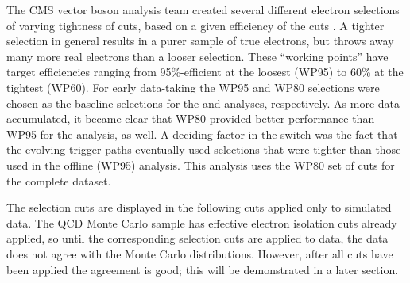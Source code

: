 The CMS vector boson analysis team created several different electron selections of varying tightness of cuts,
based on a given efficiency of the cuts \cite{CMSWZ}.  %
A tighter selection in general results in a purer sample of true electrons, but throws away many more
real electrons than a looser selection.  
These ``working points'' have target efficiencies ranging from 95\%-efficient at the loosest (WP95) to 60\% at the tightest (WP60).  
For early data-taking the WP95 and WP80 selections were chosen as the baseline selections for the \Zee and \Wenu analyses, respectively.
As more data accumulated, it became clear that WP80 provided better performance than WP95 for the \Zee analysis, as well.  
A deciding factor in the switch was the fact that the evolving trigger paths eventually used selections that were
tighter than those used in the offline (WP95) analysis.  
This analysis uses the WP80 set of cuts for the complete dataset.  

The selection cuts are displayed in the following cuts applied only to simulated data.  
The QCD Monte Carlo sample has effective electron isolation cuts already applied, 
so until the corresponding selection cuts are applied to data, 
the data does not agree with the Monte Carlo distributions.  
However, after all cuts have been applied the agreement is good; 
this will be demonstrated in a later section.  


